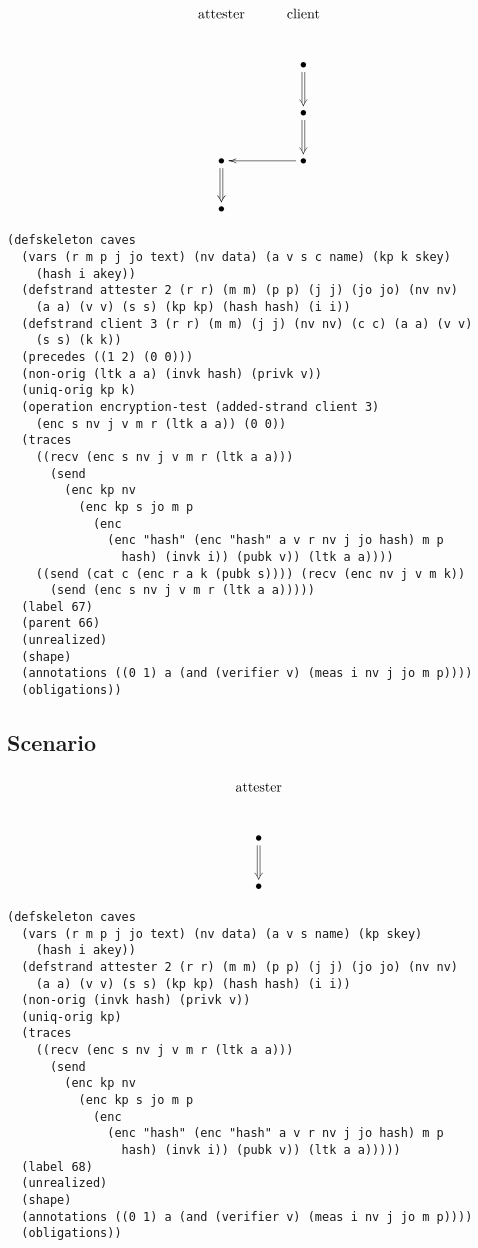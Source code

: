 \documentclass[titlepage,12pt]{article}
\theoremstyle{definition}
\begin{document}
$$\xymatrix{
\txt{\strut attester}&\txt{\strut client}\\
&\bullet\ar@{=>}[d]\\
&\bullet\ar@{=>}[d]\\
\bullet\ar@{=>}[d]&\bullet\ar[l]\\
\bullet&}$$

\begin{verbatim}
(defskeleton caves
  (vars (r m p j jo text) (nv data) (a v s c name) (kp k skey)
    (hash i akey))
  (defstrand attester 2 (r r) (m m) (p p) (j j) (jo jo) (nv nv)
    (a a) (v v) (s s) (kp kp) (hash hash) (i i))
  (defstrand client 3 (r r) (m m) (j j) (nv nv) (c c) (a a) (v v)
    (s s) (k k))
  (precedes ((1 2) (0 0)))
  (non-orig (ltk a a) (invk hash) (privk v))
  (uniq-orig kp k)
  (operation encryption-test (added-strand client 3)
    (enc s nv j v m r (ltk a a)) (0 0))
  (traces
    ((recv (enc s nv j v m r (ltk a a)))
      (send
        (enc kp nv
          (enc kp s jo m p
            (enc
              (enc "hash" (enc "hash" a v r nv j jo hash) m p
                hash) (invk i)) (pubk v)) (ltk a a))))
    ((send (cat c (enc r a k (pubk s)))) (recv (enc nv j v m k))
      (send (enc s nv j v m r (ltk a a)))))
  (label 67)
  (parent 66)
  (unrealized)
  (shape)
  (annotations ((0 1) a (and (verifier v) (meas i nv j jo m p))))
  (obligations))
\end{verbatim}

\subsection{Scenario}

$$\xymatrix{
\txt{\strut attester}\\
\bullet\ar@{=>}[d]\\
\bullet}$$

\begin{verbatim}
(defskeleton caves
  (vars (r m p j jo text) (nv data) (a v s name) (kp skey)
    (hash i akey))
  (defstrand attester 2 (r r) (m m) (p p) (j j) (jo jo) (nv nv)
    (a a) (v v) (s s) (kp kp) (hash hash) (i i))
  (non-orig (invk hash) (privk v))
  (uniq-orig kp)
  (traces
    ((recv (enc s nv j v m r (ltk a a)))
      (send
        (enc kp nv
          (enc kp s jo m p
            (enc
              (enc "hash" (enc "hash" a v r nv j jo hash) m p
                hash) (invk i)) (pubk v)) (ltk a a)))))
  (label 68)
  (unrealized)
  (shape)
  (annotations ((0 1) a (and (verifier v) (meas i nv j jo m p))))
  (obligations))
\end{verbatim}
\end{document}
